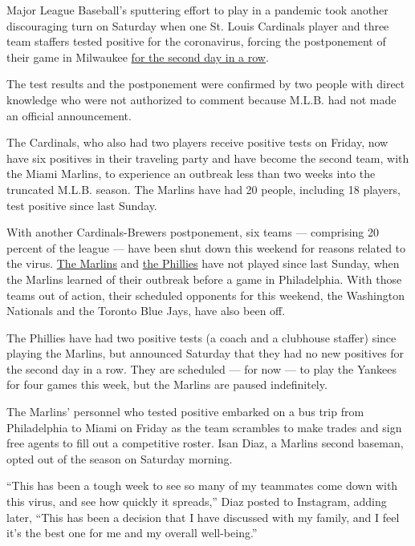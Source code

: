 Major League Baseball's sputtering effort to play in a pandemic took
another discouraging turn on Saturday when one St. Louis Cardinals
player and three team staffers tested positive for the coronavirus,
forcing the postponement of their game in Milwaukee
\href{https://www.nytimes3xbfgragh.onion/2020/07/31/sports/baseball/cardinals-twins-coronavirus-mlb.html}{for
the second day in a row}.

The test results and the postponement were confirmed by two people with
direct knowledge who were not authorized to comment because M.L.B. had
not made an official announcement.

The Cardinals, who also had two players receive positive tests on
Friday, now have six positives in their traveling party and have become
the second team, with the Miami Marlins, to experience an outbreak less
than two weeks into the truncated M.L.B. season. The Marlins have had 20
people, including 18 players, test positive since last Sunday.

With another Cardinals-Brewers postponement, six teams --- comprising 20
percent of the league --- have been shut down this weekend for reasons
related to the virus.
\href{https://www.nytimes3xbfgragh.onion/2020/07/28/sports/baseball/marlins-outbreak-mlb-coronavirus.html}{The
Marlins} and
\href{https://www.nytimes3xbfgragh.onion/2020/07/30/sports/baseball/phillies-blue-jays-postponed-coronavirus.html}{the
Phillies} have not played since last Sunday, when the Marlins learned of
their outbreak before a game in Philadelphia. With those teams out of
action, their scheduled opponents for this weekend, the Washington
Nationals and the Toronto Blue Jays, have also been off.

The Phillies have had two positive tests (a coach and a clubhouse
staffer) since playing the Marlins, but announced Saturday that they had
no new positives for the second day in a row. They are scheduled --- for
now --- to play the Yankees for four games this week, but the Marlins
are paused indefinitely.

The Marlins' personnel who tested positive embarked on a bus trip from
Philadelphia to Miami on Friday as the team scrambles to make trades and
sign free agents to fill out a competitive roster. Isan Diaz, a Marlins
second baseman, opted out of the season on Saturday morning.

``This has been a tough week to see so many of my teammates come down
with this virus, and see how quickly it spreads,'' Diaz posted to
Instagram, adding later, ``This has been a decision that I have
discussed with my family, and I feel it's the best one for me and my
overall well-being.''


